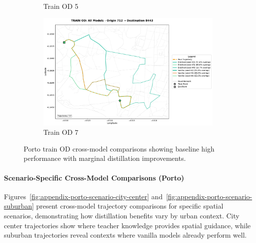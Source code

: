\begin{figure}[H]
\begin{subfigure}{0.49\linewidth}
        \caption{Train OD 5}
    \end{subfigure}
    \begin{subfigure}{0.49\linewidth}
        \centering
        \includegraphics[width=\linewidth]{assets/plots/eval/porto/cross_model/train/train_od_comparison_7_origin712_dest8443.pdf}
        \caption{Train OD 7}
    \end{subfigure}
    \caption{Porto train OD cross-model comparisons showing baseline high performance with marginal distillation improvements.}
    \label{fig:appendix-porto-cross-train}
\end{figure}

\paragraph{Scenario-Specific Cross-Model Comparisons (Porto)}

Figures~\ref{fig:appendix-porto-scenario-city-center} and~\ref{fig:appendix-porto-scenario-suburban} present cross-model trajectory comparisons for specific spatial scenarios, demonstrating how distillation benefits vary by urban context. City center trajectories show where teacher knowledge provides spatial guidance, while suburban trajectories reveal contexts where vanilla models already perform well.

